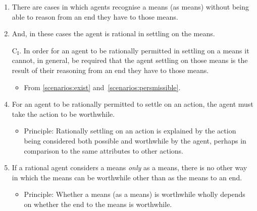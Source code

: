 \documentclass[10pt]{article}
\begin{document}
\begin{enumerate}[label=\arabic*., ref=(\arabic*)]

\item\label{scenarios:exist} There are cases in which agents recognise a means (as means) without being able to reason from an end they have to those means.

\item\label{scenarios:persmissible} And, in these cases the agent is rational in settling on the means.

\item[C\(_{\text{I}}\).]\label{scenario:no-reasoning} In order for an agent to be rationally permitted in settling on a means it cannot, in general, be required that the agent settling on those means is the result of their reasoning from an end they have to those means.

  \begin{itemize}
  \item From \ref{scenarios:exist} and~\ref{scenarios:persmissible}.
  \end{itemize}

\item\label{settle:worthwhile} For an agent to be rationally permitted to settle on an action, the agent must take the action to be worthwhile.

  \begin{itemize}
  \item Principle: Rationally settling on an action is explained by the action being considered both possible and worthwhile by the agent, perhaps in comparison to the same attributes to other actions.
  \end{itemize}

\item\label{m-e:dependence} If a rational agent considers a means \emph{only} as a means, there is no other way in which the means can be worthwhile other than as the means to an end.

  \begin{itemize}
  \item Principle: Whether a means (as a means) is worthwhile wholly depends on whether the end to the means is worthwhile.
  \end{itemize}


\end{enumerate}
\end{document}
